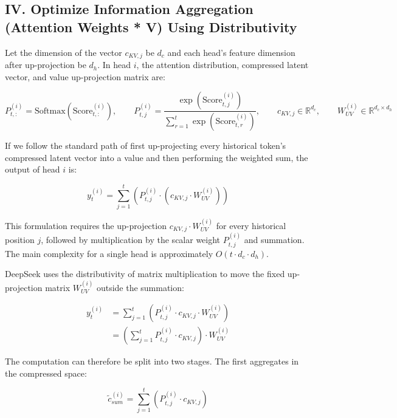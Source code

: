\hypertarget{iv.-optimize-information-aggregation-attention-weights-v-using-distributivity}{%
\subsection{IV. Optimize Information Aggregation (Attention Weights * V) Using Distributivity}\label{iv.-optimize-information-aggregation-attention-weights-v-using-distributivity}}

Let the dimension of the vector \(c_{KV,j}\) be \(d_c\) and each head's feature dimension after up-projection be \(d_h\). In head \(i\), the attention distribution, compressed latent vector, and value up-projection matrix are:

\[
P_{t,:}^{(i)} = \mathrm{Softmax}(\mathrm{Score}_{t,:}^{(i)}),\qquad
P_{t,j}^{(i)} =
\frac{\exp(\mathrm{Score}_{t,j}^{(i)})}{\sum_{r=1}^{t}\exp(\mathrm{Score}_{t,r}^{(i)})},\qquad
c_{KV,j}\in \mathbb{R}^{d_c},\qquad
W_{UV}^{(i)}\in \mathbb{R}^{d_c \times d_h}
\]

If we follow the standard path of first up-projecting every historical token's compressed latent vector into a value and then performing the weighted sum, the output of head \(i\) is:

\[
y_t^{(i)}
=
\sum_{j=1}^{t}
\left(P_{t,j}^{(i)} \cdot (c_{KV,j} \cdot W_{UV}^{(i)})\right)
\]

This formulation requires the up-projection \(c_{KV,j} \cdot W_{UV}^{(i)}\) for every historical position \(j\), followed by multiplication by the scalar weight \(P_{t,j}^{(i)}\) and summation. The main complexity for a single head is approximately \(O(t \cdot d_c \cdot d_h)\).

DeepSeek uses the distributivity of matrix multiplication to move the fixed up-projection matrix \(W_{UV}^{(i)}\) outside the summation:

\[
\begin{aligned}
y_t^{(i)}
&= \sum_{j=1}^{t}\left(P_{t,j}^{(i)} \cdot c_{KV,j} \cdot W_{UV}^{(i)}\right) \\
&= \left(\sum_{j=1}^{t}P_{t,j}^{(i)} \cdot c_{KV,j}\right) \cdot W_{UV}^{(i)}
\end{aligned}
\]

The computation can therefore be split into two stages. The first aggregates in the compressed space:

\[
\tilde c_{sum}^{(i)}
=
\sum_{j=1}^{t}\left(P_{t,j}^{(i)} \cdot c_{KV,j}\right)
\]

